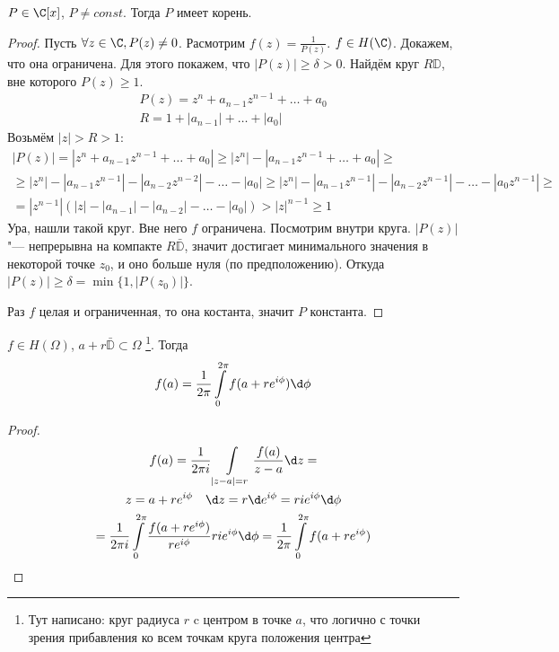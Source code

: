 \begin{theorem}
	$P \in \C[x]$, $P \ne const$.
	Тогда $P$ имеет корень.
\end{theorem}
\begin{proof}
	Пусть $\forall z \in \C, P(z) \ne 0$.
	Расмотрим $f(z) = \frac1{P(z)}$. $f \in H(\C)$.
	Докажем, что она ограничена.
	Для этого покажем, что $|P(z)| \ge \delta > 0$.
	Найдём круг $R\mathbb D$, вне которого $P(z) \ge 1$.
	\begin{gather*}
		P(z) = z^n + a_{n-1} z^{n-1} + \dots + a_0 \\
		R = 1 + |a_{n-1}| + \dots + |a_0|
	\end{gather*}
	Возьмём $|z| > R > 1$:
	\begin{gather*}
		|P(z)| = |z^n + a_{n-1} z^{n-1} + \dots + a_0|
		\ge |z^n| - |a_{n-1} z^{n-1} + \dots + a_0| \ge \\
		\ge |z^n| - |a_{n-1} z^{n-1}| - |a_{n-2} z^{n-2}| - \dots - |a_0|
		\ge |z^n| - |a_{n-1} z^{n-1}| - |a_{n-2} z^{n-1}| - \dots - |a_0 z^{n-1}| \ge \\
		= |z^{n-1}| (|z| - |a_{n-1}| - |a_{n-2}| - \dots - |a_0|) > |z|^{n-1} \ge 1
	\end{gather*}
	Ура, нашли такой круг. Вне него $f$ ограничена.
	Посмотрим внутри круга.
	$|P(z)|$ "--- непрерывна на компакте $R\bar{\mathbb D}$,
	значит достигает минимального значения в некоторой точке $z_0$, и оно больше нуля (по предположению).
	Откуда $|P(z)| \ge \delta = \min\{1, |P(z_0)|\}$.

	Раз $f$ целая и ограниченная, то она костанта, значит $P$ константа.
\end{proof}

\begin{theorem}[О среднем]
	$f \in H(\Omega)$, $a + r\bar{\mathbb D} \subset \Omega$
	\footnote{Тут написано: круг радиуса $r$ c центром в точке $a$, что логично с точки зрения прибавления ко всем точкам круга положения центра}.
	Тогда
	\[ f(a) = \frac1{2\pi} \int\limits_0^{2\pi} f(a + re^{i\phi}) \d \phi \]
\end{theorem}
\begin{proof}
	\begin{gather*}
		f(a)
		= \frac1{2\pi i} \int\limits_{|z - a| = r} \frac{f(a)}{z - a} \d z = \\
		z = a + re^{i\phi} \quad \d z = r \d e^{i\phi} = rie^{i\phi} \d \phi \\
		= \frac1{2\pi i}\int\limits_0^{2\pi} \frac{f(a + re^{i\phi})}{re^{i\phi}} rie^{i\phi} \d \phi
		= \frac1{2\pi} \int\limits_0^{2\pi} f(a + re^{i\phi})
	\end{gather*}
\end{proof}


